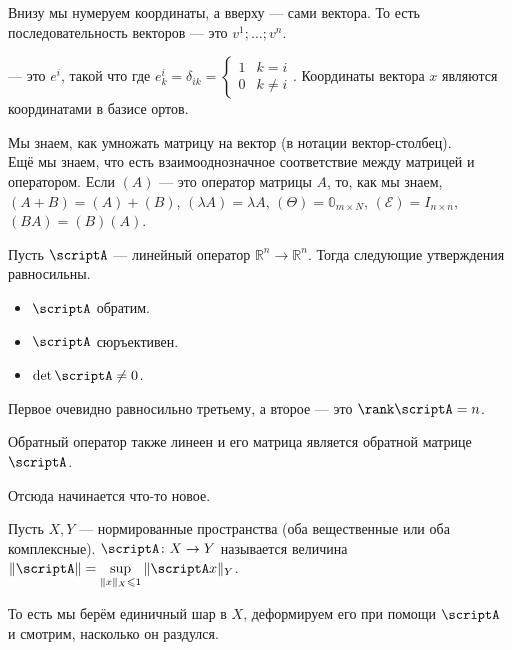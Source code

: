 \documentclass{article}
\begin{document}
\begin{itemize}
\begin{Comment}
            Внизу мы нумеруем координаты, а вверху --- сами вектора. То есть последовательность векторов --- это $v^1;\ldots;v^n$.
        \end{Comment}
        \dfn {} --- это $e^i$, такой что где $e^i_k=\delta_{ik}=\begin{cases}
            1 & k=i\\
            0 & k\neq i
        \end{cases}$.
        \thm Координаты вектора $x$ являются координатами в базисе ортов.
        \begin{Comment}
            Мы знаем, как умножать матрицу на вектор (в нотации вектор-столбец).\\
            Ещё мы знаем, что есть взаимооднозначное соответствие между матрицей и оператором. Если $(A)$ --- это оператор матрицы $A$, то, как мы знаем, $(A+B)=(A)+(B)$, $(\lambda A)=\lambda A$, $(\Theta)=\mathbb 0_{m\times N}$, $(\mathcal E)=I_{n\times n}$, $(BA)=(B)(A)$.
        \end{Comment}
        \thm Пусть $\scriptA$ --- линейный оператор $\mathbb R^n\to\mathbb R^n$. Тогда следующие утверждения равносильны.
        \begin{itemize}
            \item $\scriptA$ обратим.
            \item $\scriptA$ сюръективен.
            \item $\det\scriptA\neq0$.
        \end{itemize}
        \begin{Proof}
            Первое очевидно равносильно третьему, а второе --- это $\rank\scriptA=n$.
        \end{Proof}
        \thm Обратный оператор также линеен и его матрица является обратной матрице $\scriptA$.
        \begin{Comment}
            Отсюда начинается что-то новое.
        \end{Comment}
        \dfn Пусть $X,Y$ --- нормированные пространства (оба вещественные или оба комплексные).   $\scriptA\colon X\to Y$ называется величина $\|\scriptA\|=\sup\limits_{\|x\|_X\leqslant1}\|\scriptA x\|_Y$.
        \begin{Comment}
            То есть мы берём единичный шар в $X$, деформируем его при помощи $\scriptA$ и смотрим, насколько он раздулся.
        \end{Comment}
        \begin{Comment}

\end{Comment}
\end{itemize}
\end{document}
